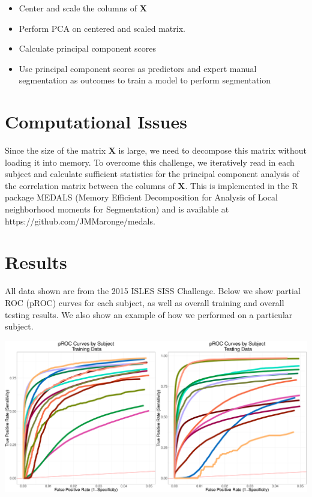 \documentclass[a0,landscape]{a0poster}
\begin{document}
\begin{multicols}{3}
\begin{itemize}
\item  Center and scale the columns of $\mathbf{X}$
\item Perform PCA on centered and scaled matrix.
\item Calculate principal component scores 
\item Use principal component scores as predictors and expert manual segmentation as outcomes to train a model to perform segmentation
\end{itemize}
\large{\section*{\color{uwred}Computational Issues}}
\noindent Since the size of the matrix $\mathbf{X}$ is large, we need to decompose this matrix without loading it into memory. To overcome this challenge, we iteratively read in each subject and calculate sufficient statistics for the principal component analysis of the correlation matrix between the columns of $\mathbf{X}$. This is implemented in the R package MEDALS (Memory Efficient Decomposition for Analysis of Local neighborhood moments for Segmentation) and is available at https://github.com/JMMaronge/medals.
\vspace{.5cm}

\large{\section*{\color{uwred}Results}}
\noindent All data shown are from the 2015 ISLES SISS Challenge. Below we show partial ROC (pROC) curves for each subject, as well as overall training and overall testing results. We also show an example of how we performed on a particular subject.

\begin{center}\vspace{.5cm}
\includegraphics[width=1\linewidth]{procbysubject.pdf}
\end{center}\vspace{.5cm}


\end{multicols}
\end{document}
